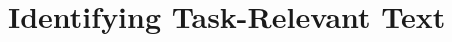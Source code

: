 \setcounter{chapter}{5}
\setcounter{rq}{1}


\chapter{Identifying Task-Relevant Text}
\label{ch:assisting}















\clearpage


% 


% 

% 







% 


